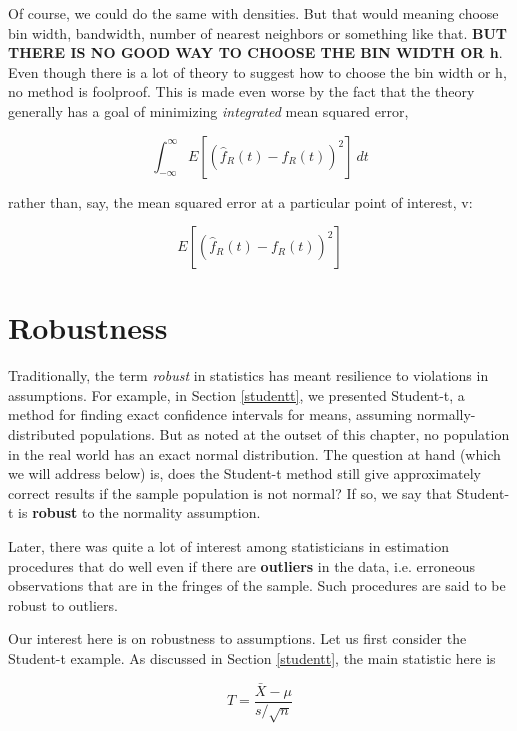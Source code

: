 Of course, we could do the same with densities.  But that would meaning
choose bin width, bandwidth, number of nearest neighbors or something
like that.  {\bf BUT THERE IS NO GOOD WAY TO CHOOSE THE BIN WIDTH OR h}.
Even though there is a lot of theory to suggest how to choose the bin
width or h, no method is foolproof.  This is made even worse by the fact
that the theory generally has a goal of minimizing {\it integrated} mean
squared error,

\begin{equation}
\int_{-\infty}^{\infty} E \left [ \left ( \widehat{f}_R(t) - f_R(t) \right
)^2 \right ] ~ dt
\end{equation}

rather than, say, the mean squared error at a particular point of
interest, v:

\begin{equation}
E \left [ \left ( \widehat{f}_R(t) - f_R(t) \right)^2 \right ] 
\end{equation}

\section{Robustness}

Traditionally, the term {\it robust} in statistics has meant resilience
to violations in assumptions.  For example, in Section \ref{studentt},
we presented Student-t, a method for finding exact confidence intervals
for means, assuming normally-distributed populations.  But as noted at
the outset of this chapter, no population in the real world has an exact
normal distribution.  The question at hand (which we will address below)
is, does the Student-t method still give approximately correct results
if the sample population is not normal?  If so, we say that Student-t is
{\bf robust} to the normality assumption.

Later, there was quite a lot of interest among statisticians in
estimation procedures that do well even if there are {\bf outliers} 
in the data, i.e. erroneous observations that are in the fringes of the
sample.  Such procedures are said to be robust to outliers.

Our interest here is on robustness to assumptions.  Let us first
consider the Student-t example.  As discussed in Section \ref{studentt},
the main statistic here is

\begin{equation}
T = \frac{\bar{X}-\mu}{s/\sqrt{n}}
\end{equation}


